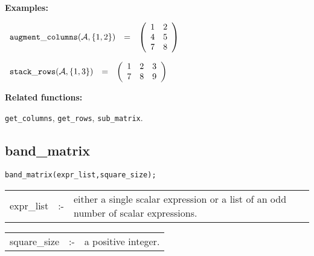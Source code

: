 {\bf Examples:}

\begin{flushleft}  
\hspace*{0.1in}
\begin{math}
\begin{array}{ccc}
{\tt augment\_columns}({\cal A},\{1,2\}) & = & 
\left( \begin{array}{cc} 1 & 2 \\ 4 & 5 \\ 7 & 8  
\end{array} \right)  
\end{array}
\end{math}  
\end{flushleft}

\vspace*{0.1in}

\begin{flushleft}  
\hspace*{0.1in}
\begin{math}  
\begin{array}{ccc}
{\tt stack\_rows}({\cal A},\{1,3\}) & = & 
\left( \begin{array}{ccc} 1 & 2 & 3 \\ 7 & 8 & 9
\end{array} \right)  
\end{array}  
\end{math}
\end{flushleft}

{\bf Related functions:}

\hspace*{0.175in} {\tt get\_columns}, {\tt get\_rows}, 
{\tt sub\_matrix}.


\subsection{band\_matrix}


\hspace*{0.175in} {\tt band\_matrix(expr\_list,square\_size);}

\hspace*{0.1in}
\begin{tabular}{l l l}
expr\_list  \hspace*{0.088in} &:-& \parbox[t]{.72\linewidth}
{either a single scalar expression or a list of an odd number of scalar
expressions.} 
\end{tabular}

\vspace*{0.04in}
\hspace*{0.1in}
\begin{tabular}{l l l}
square\_size &:-& a positive integer.
\end{tabular}



